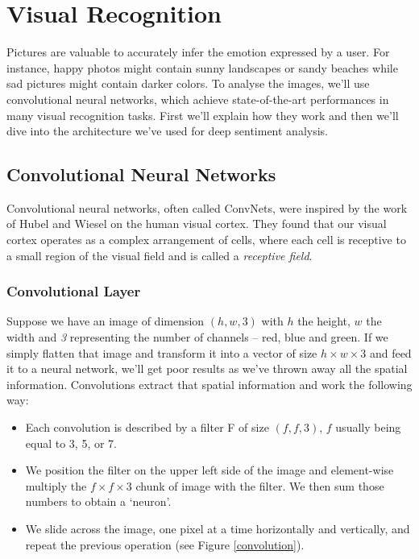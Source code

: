 \chapter{Visual Recognition}
Pictures are valuable to accurately infer the emotion expressed by a user. For instance, happy photos might contain sunny landscapes or sandy beaches while sad pictures might contain darker colors. To analyse the images, we'll use convolutional neural networks, which achieve state-of-the-art performances in many visual recognition tasks. First we'll explain how they work and then we'll dive into the architecture we've used for deep sentiment analysis.
\section{Convolutional Neural Networks}
Convolutional neural networks, often called ConvNets, were inspired by the work of Hubel and Wiesel \cite{hubel} on the human visual cortex. They found that our visual cortex operates as a complex arrangement of cells, where each cell is receptive to a small region of the visual field and is called a {\em receptive field}.

\subsection{Convolutional Layer}
Suppose we have an image of dimension $(h,w,3)$ with $h$ the height, $w$ the width and {\em3} representing the number of channels -- red, blue and green. If we simply flatten that image and transform it into a vector of size $h\times w \times 3$ and feed it to a neural network, we'll get poor results as we've thrown away all the spatial information. Convolutions extract that spatial information and work the following way:
\begin{itemize}
    \item Each convolution is described by a filter F of size $(f, f, 3)$, $f$ usually being equal to 3, 5, or 7.
    \item We position the filter on the upper left side of the image and element-wise multiply the $f\times f \times 3$ chunk of image with the filter. We then sum those 
    numbers to obtain a `neuron'.
    \item We slide across the image, one pixel at a time horizontally and vertically, and repeat the previous operation (see Figure \ref{convolution}).
\end{itemize}

